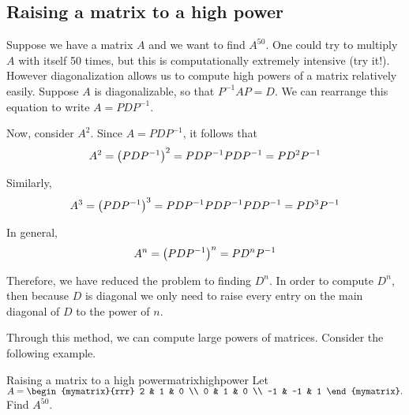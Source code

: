 \subsection{Raising a matrix to a high power}

Suppose we have a matrix $A$ and we want to find $A^{50}$. One could
try to multiply $A$ with itself 50 times, but this is computationally
extremely intensive (try it!). However diagonalization allows us to
compute high powers of a matrix relatively easily.  Suppose $A$ is
diagonalizable, so that $P^{-1}AP=D$. We can rearrange this equation
to write $A=PDP^{-1}$.

Now, consider $A^{2}$. Since $A=PDP^{-1}$, it follows that 
\begin{equation*}
A^{2} = \left(PDP^{-1}\right) ^{2}=PDP^{-1}PDP^{-1}=PD^{2}P^{-1}
\end{equation*}

Similarly, 
\begin{equation*}
A^3 = \left(PDP^{-1}\right) ^{3}=PDP^{-1}PDP^{-1}PDP^{-1}=PD^{3}P^{-1}
\end{equation*}

In general,
\begin{equation*}
A^n = \left(PDP^{-1}\right) ^{n}=PD^{n}P^{-1}
\end{equation*}

Therefore, we have reduced the problem to finding $D^{n}$. In order to
compute $D^{n}$, then because $D$ is diagonal we only need to raise
every entry on the main diagonal of $D$ to the power of $n$.

Through this method, we can compute large powers of matrices. Consider the following example.

\begin{example}{Raising a matrix to a high power}{matrixhighpower}
Let
  $A=\begin{mymatrix}{rrr}
2 & 1 & 0 \\
0 & 1 & 0 \\
-1 & -1 & 1
\end{mymatrix}. $ Find $A^{50}.$
\end{example}

